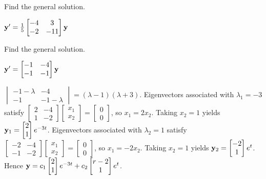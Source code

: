 \documentclass{ximera}
\begin{document}
\begin{problem}\label{exer:10.4.3}
Find the general solution.

$ {\bf y}'=
\frac{1}{5}\begin{bmatrix}-4&3\\
-2&-11\end{bmatrix}{\bf y}$
\end{problem}

\begin{problem}\label{exer:10.4.4}
Find the general solution.

$ {\bf y}'=
\begin{bmatrix}-1&-4\\-1&-1\end{bmatrix}{\bf y}$

\begin{solution}
    $\begin{vmatrix}-1-\lambda&-4\\-1&-1-\lambda\end{vmatrix}
=(\lambda-1)(\lambda+3)$.
Eigenvectors  associated with $\lambda_1=-3$ satisfy
$\begin{bmatrix}2&-4\\1&-2
\end{bmatrix}\begin{bmatrix}
x_1\\x_2\end{bmatrix}=\begin{bmatrix}0\\0\end{bmatrix}$,
so $x_1=2x_2$.  Taking $x_2=1$ yields
${\bf y}_1=\begin{bmatrix}
2\\1\end{bmatrix}e^{-3t}$.
Eigenvectors  associated with $\lambda_2=1$  satisfy
$\begin{bmatrix}-2&-4\\-1&-2
\end{bmatrix}\begin{bmatrix}
x_1\\x_2\end{bmatrix}=\begin{bmatrix}0\\0\end{bmatrix}$,
so $x_1=-2x_2$.  Taking $x_2=1$ yields
${\bf y}_2=\begin{bmatrix} -2\\1\end{bmatrix}e^t$.
Hence  ${\bf y}= c_1\begin{bmatrix} 2\\1\end{bmatrix}e^{-3t}+c_2\begin{bmatrix}{r}-2\\1\end{bmatrix}e^t$.
\end{solution}
\end{problem}
\end{document}
